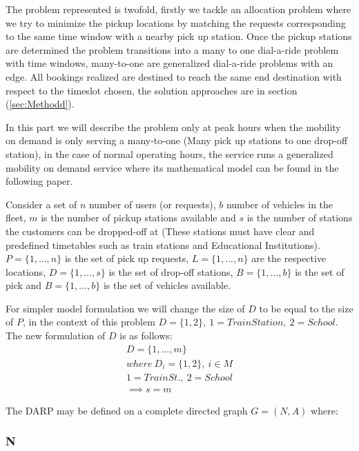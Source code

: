 \documentclass{article}
\begin{document}
The problem represented is twofold, firstly we tackle an allocation problem where we try to minimize the pickup locations by matching the requests corresponding to the same time window with a nearby pick up station. Once the pickup stations are determined the problem transitions into a many to one dial-a-ride problem with time windows, many-to-one are generalized dial-a-ride problems with an edge. All bookings realized are destined to reach the same end destination with respect to the timeslot chosen, the solution approaches are in section (\ref{sec:Methodd}).


In this part we will describe the problem only at peak hours when the mobility on demand is only serving a many-to-one (Many pick up stations to one drop-off station), in the case of normal operating hours, the service runs a generalized 
mobility on demand service where its mathematical model can be found in the following paper. \citep{2008_Cordeau_Laporte}


Consider a set of $n$ number of users (or requests), $b$ number of vehicles in the fleet, $m$ is the number of pickup stations available and $s$ is the number of stations the customers can be dropped-off at (These stations must have clear and predefined timetables such as train stations and Educational Institutions). $P = \{ 1, ..., n \}$ is the set of pick up requests, $L = \{ 1, ..., n \}$ are the respective locations, $D =  \{ 1, ..., s \}$ is the set of drop-off stations,  $B =  \{ 1, ..., b \}$ is the set of pick and $B =  \{ 1, ..., b \}$ is the set of vehicles available.

For simpler model formulation we will change the size of $D$ to be equal to the size of $P$, in the context of this problem $D = \{1,2\},\ 1 = Train Station,\ 2 = School$. The new formulation of $D$ is as follows:
\begin{equation*}
\begin{array}{l}
D = \{1, ..., m\}\\
where\ D_i = \{1,2\}, \ i \in M \\
1 = Train St.,\ 2 = School \\
 \implies s = m 
\end{array}
\end{equation*}


The DARP may be defined on a complete directed graph $G = (N,A)$ where:


\subsubsection*{N}
\end{document}
